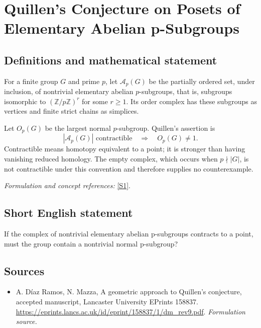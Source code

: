 \documentclass[11pt]{article}
\begin{document}
\section*{\texorpdfstring{Quillen's Conjecture on Posets of Elementary Abelian p-Subgroups}{Quillen's Conjecture on Posets of Elementary Abelian p-Subgroups}}\label{497}
\subsection{Definitions and mathematical statement}
For a finite group $G$ and prime $p$, let $\mathcal A_p(G)$ be the partially ordered set, under inclusion, of nontrivial elementary abelian $p$-subgroups, that is, subgroups isomorphic to $({\mathbb{Z}}/p{\mathbb{Z}})^r$ for some $r\ge1$. Its order complex has these subgroups as vertices and finite strict chains as simplices.

Let $O_p(G)$ be the largest normal $p$-subgroup. Quillen's assertion is
\[
 |\mathcal A_p(G)|\text{ contractible}
                   \quad\Longrightarrow\quad O_p(G)\ne1.
\]
Contractible means homotopy equivalent to a point; it is stronger than having vanishing reduced homology. The empty complex, which occurs when $p\nmid|G|$, is not contractible under this convention and therefore supplies no counterexample.
\par\smallskip\textit{Formulation and concept references:} \href{https://eprints.lancs.ac.uk/id/eprint/158837/1/dm_rev9.pdf}{[S1]}.

\subsection{Short English statement}
If the complex of nontrivial elementary abelian p-subgroups contracts to a point, must the group contain a nontrivial normal p-subgroup?
\subsection{Sources}
\begin{itemize}
\item[S1]A. Díaz Ramos, N. Mazza, A geometric approach to Quillen's conjecture, accepted manuscript, Lancaster University EPrints 158837.
\url{https://eprints.lancs.ac.uk/id/eprint/158837/1/dm_rev9.pdf}.
\textit{Formulation source.}
\end{itemize}
\end{document}
